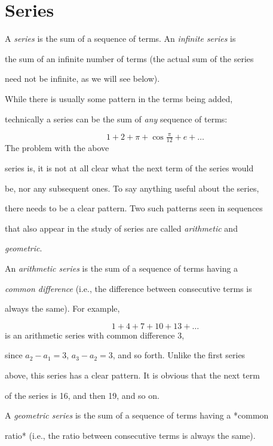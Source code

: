 \section{Series}
\label{sec:series}

A \textit{series} is the sum of a sequence of terms. An \textit{infinite series} is

the sum of an infinite number of terms (the actual sum of the series

need not be infinite, as we will see below).



While there is usually some pattern in the terms being added,

technically a series can be the sum of \textit{any} sequence of terms:



$$1+2+\pi+\cos\tfrac{\pi}{12}+e+\ldots$$ The problem with the above

series is, it is not at all clear what the next term of the series would

be, nor any subsequent ones. To say anything useful about the series,

there needs to be a clear pattern. Two such patterns seen in sequences

that also appear in the study of series are called \textit{arithmetic} and

\textit{geometric}.



An \textit{arithmetic series} is the sum of a sequence of terms having a

\textit{common difference} (i.e., the difference between consecutive terms is

always the same). For example,



$$1+4+7+10+13+\dots$$ is an arithmetic series with common difference 3,

since $a _2-a _1=3$, $a _3-a _2=3$, and so forth. Unlike the first series

above, this series has a clear pattern. It is obvious that the next term

of the series is 16, and then 19, and so on.



A \textit{geometric series} is the sum of a sequence of terms having a *common

ratio* (i.e., the ratio between consecutive terms is always the same).

